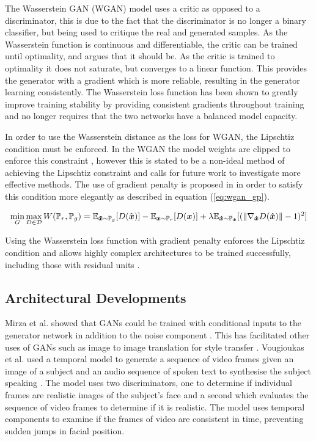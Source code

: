 The Wasserstein GAN (WGAN) model uses a critic as opposed to a discriminator, this is due to the fact that the discriminator is no longer a binary classifier, but being used to critique the real and generated samples. 
As the Wasserstein function is continuous and differentiable, the critic can be trained until optimality, and \cite{Arjovsky2017} argues that it should be.
As the critic is trained to optimality it does not saturate, but converges to a linear function.
This provides the generator with a gradient which is more reliable, resulting in the generator learning consistently.
The Wasserstein loss function has been shown to greatly improve training stability by providing consistent gradients throughout training and no longer requires that the two networks have a balanced model capacity.

In order to use the Wasserstein distance as the loss for WGAN, the Lipschtiz condition must be enforced.
In the WGAN the model weights are clipped to enforce this constraint \cite{Arjovsky2017}, however this is stated to be a non-ideal method of achieving the Lipschtiz constraint and calls for future work to investigate more effective methods.
The use of gradient penalty is proposed in \cite{Gulrajani2017} in order to satisfy this condition more elegantly as described in equation (\ref{eq:wgan_gp}).

\begin{equation} \label{eq:wgan_gp}
    \min_{G} \max_{D \in \mathcal{D}} W(\mathbb{P}_{r}, \mathbb{P}_{g}) 
        = \mathbb{E}_{{\boldsymbol{{\tilde{x}}}} \sim \mathbb{P}_{g}} [D(\tilde{{{\boldsymbol{{x}}}}})]
        - \mathbb{E}_{{\boldsymbol{{x}}} \sim \mathbb{P}_{r}} [D({\boldsymbol{{x}}})]
        + \lambda \mathbb{E}_{{\boldsymbol{{\hat{x}}}} \sim \mathbb{P}_{{\boldsymbol{{\hat{x}}}}}} 
            [(\| \nabla_{{\boldsymbol{{\hat{x}}}}} D({\boldsymbol{{\hat{x}}}}) \| - 1)^2]
\end{equation}
\quad

Using the Wasserstein loss function with gradient penalty enforces the Lipschtiz condition and allows highly complex architectures to be trained successfully, including those with residual units \cite{Gulrajani2017}.

\subsection{Architectural Developments}
Mirza et al. showed that GANs could be trained with conditional inputs to the generator network in addition to the noise component \cite{Mirza2014}.
This has facilitated other uses of GANs such as image to image translation for style transfer \cite{Zhu2017}.
Vougioukas et al. used a temporal model to generate a sequence of video frames given an image of a subject and an audio sequence of spoken text to synthesise the subject speaking \cite{Vougioukas2018}.
The model uses two discriminators, one to determine if individual frames are realistic images of the subject's face and a second which evaluates the sequence of video frames to determine if it is realistic.
The model uses temporal components to examine if the frames of video are consistent in time, preventing sudden jumps in facial position.

